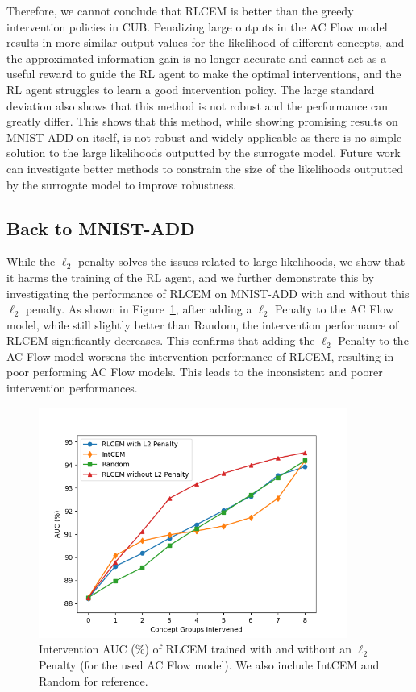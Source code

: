 Therefore, we cannot conclude that RLCEM is better than the greedy
intervention policies in CUB. Penalizing large outputs 
in the AC Flow model results in more similar output values for the likelihood
of different concepts, and the approximated information gain is no longer
accurate and cannot act as a useful reward to guide the RL agent to make 
the optimal interventions, and the RL agent struggles to learn a good intervention policy.
The large standard deviation also shows that this method is not robust
and the performance can greatly differ.
This shows that this method, while showing promising results on MNIST-ADD on itself,
is not robust and widely applicable as 
there is no simple solution to the large likelihoods outputted by the surrogate model. Future work can investigate better methods
to constrain the size of the likelihoods outputted by the surrogate model to improve robustness.

\subsection{Back to MNIST-ADD}\label{eval:back-to-mnist}
While the $\ell_2$ penalty solves the issues 
related to large likelihoods, we show that 
it harms the training of the RL agent,
and we further demonstrate this by
investigating the performance of RLCEM on MNIST-ADD with and without
this $\ell_2$ penalty.
As shown in Figure~\ref{fig:mnist-rlcem-performance-l2},
after adding a $\ell_2$ Penalty to the AC Flow model,
while still slightly better than Random, the intervention performance of RLCEM significantly decreases.
This confirms that adding the $\ell_2$ Penalty
to the AC Flow model worsens the intervention performance of 
RLCEM, resulting in poor performing 
AC Flow models.
This leads to the inconsistent and poorer
intervention performances.

\begin{figure}[!h]
    \centering
    \includegraphics[width=0.9\textwidth]{figs/evaluation/mnist_rlcem_performance_l2.png}
    \caption{
        Intervention AUC (\%) of RLCEM trained with and without an $\ell_2$ Penalty (for the used AC Flow model).
        We also include IntCEM and Random for reference.
    }
    \label{fig:mnist-rlcem-performance-l2}
\end{figure}



